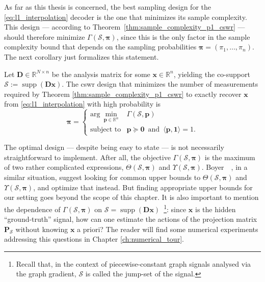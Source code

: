 As far as this thesis is concerned, the best sampling design for the \eqref{eq:l1_interpolation} decoder is the one that minimizes its sample complexity. This design --- according to Theorem~\ref{thm:sample_complexity_p1_cswr} --- should therefore minimize $\Gamma(\mathcal{S}, \bm{\pi})$, since this is the only factor in the sample complexity bound that depends on the sampling probabilities $\bm{\pi} = (\pi_1, \dots, \pi_n)$. The next corollary just formalizes this statement.

\begin{corollary}\label{cor:opt_samp_design}
    Let $\mathbf{D} \in \mathbb{R}^{N \times n}$ be the analysis matrix for some $\mathbf{x} \in \mathbb{R}^{n}$, yielding the co-support $\mathcal{S} := \operatorname{supp}\left ( \mathbf{Dx} \right )$. The \acrshort{cswr} design that minimizes the number of measurements required by Theorem \ref{thm:sample_complexity_p1_cswr} to exactly recover $\mathbf{x}$ from \eqref{eq:l1_interpolation} with high probability is
    \begin{equation}
        \bm{\pi} = \left \{
        \begin{matrix}
            \text{arg} \enspace \underset{\mathbf{p} \in \mathbb{R}^{n}}{\min} & \Gamma(\mathcal{S}, \mathbf{p}) \\
            \text{subject to} & \mathbf{p} \succeq \mathbf{0} \enspace \text{and} \enspace \langle \mathbf{p}, \mathbf{1} \rangle = 1.
        \end{matrix}
        \right.
    \end{equation}
\end{corollary}

\clearpage

The optimal design --- despite being easy to state --- is not necessarily straightforward to implement. After all, the objective $\Gamma(\mathcal{S}, \bm{\pi})$ is the maximum of two rather complicated expressions, $\Theta(\mathcal{S}, \bm{\pi})$ and $\Upsilon(\mathcal{S}, \bm{\pi})$. Boyer~\etal~\cite{boyer2019}, in a similar situation, suggest looking for common upper bounds to $\Theta(\mathcal{S}, \bm{\pi})$ and $\Upsilon(\mathcal{S}, \bm{\pi})$, and optimize that instead. But finding appropriate upper bounds for our setting goes beyond the scope of this chapter. It is also important to mention the dependence of $\Gamma(\mathcal{S}, \bm{\pi})$ on $\mathcal{S} = \operatorname{supp}\left ( \mathbf{Dx} \right )$~\footnote{Recall that, in the context of piecewise-constant graph signals analysed via the graph gradient, $\mathcal{S}$ is called the jump-set of the signal.}: since $\mathbf{x}$ is the hidden ``ground-truth'' signal, how can one estimate the actions of the projection matrix $\mathbf{P}_{\mathcal{S}}$ without knowing $\mathbf{x}$ a priori? The reader will find some numerical experiments addressing this questions in Chapter \ref{ch:numerical_tour}.


